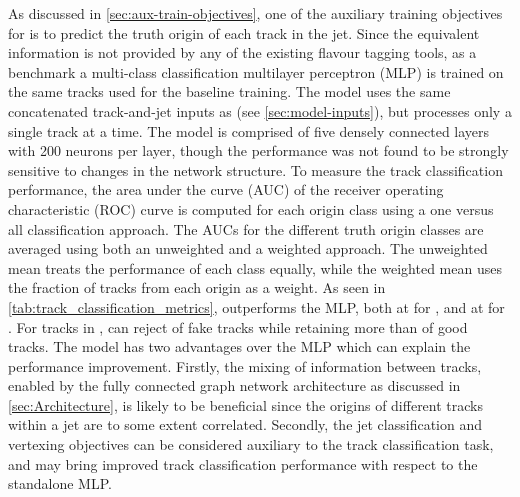 As discussed in \cref{sec:aux-train-objectives}, one of the auxiliary training objectives for \GNN is to predict the truth origin of each track in the jet.
Since the equivalent information is not provided by any of the existing flavour tagging tools, as a benchmark a multi-class classification multilayer perceptron (MLP) is trained on the same tracks used for the baseline \GNN training.
The model uses the same concatenated track-and-jet inputs as \GNN (see \cref{sec:model-inputs}), but processes only a single track at a time.
The model is comprised of five densely connected layers with 200 neurons per layer, though the performance was not found to be strongly sensitive to changes in the network structure. 
To measure the track classification performance, the area under the curve (AUC) of the receiver operating characteristic (ROC) curve is computed for each origin class using a one versus all classification approach.
The AUCs for the different truth origin classes are averaged using both an unweighted and a weighted approach.
The unweighted mean treats the performance of each class equally, while the weighted mean uses the fraction of tracks from each origin as a weight.
As seen in \cref{tab:track_classification_metrics}, \GNN outperforms the MLP, both at \ttbarpt for \ttbarjets, and at \Zprimept for \Zprimejets.
For tracks in \ttbarjets, \GNN can reject  of fake tracks while retaining more than  of good tracks.
The \GNN model has two advantages over the MLP which can explain the performance improvement.
Firstly, the mixing of information between tracks, enabled by the fully connected graph network architecture as discussed in \cref{sec:Architecture}, is likely to be beneficial since the origins of different tracks within a jet are to some extent correlated.
Secondly, the jet classification and vertexing objectives can be considered auxiliary to the track classification task, and may bring improved track classification performance with respect to the standalone MLP.

